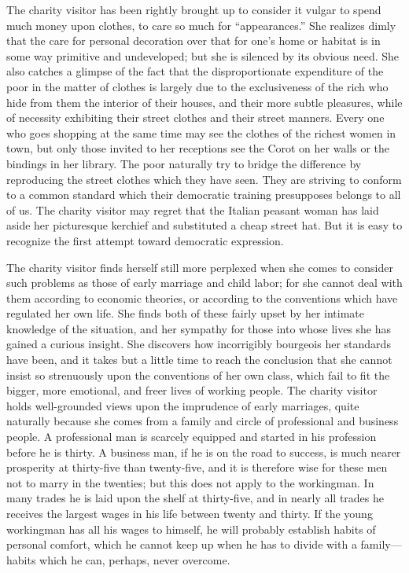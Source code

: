 \documentclass[]{article}
\begin{document}
\begin{sectionbody}
\addamsparagraph The charity visitor has been rightly brought up to consider it vulgar to
spend much money upon clothes, to care so much for ``appearances.'' She
realizes dimly that the care for personal decoration over that for one's
home or habitat is in some way primitive and undeveloped; but she is
silenced by its obvious need. She also catches a glimpse of the fact
that the disproportionate expenditure of the poor in the matter of
clothes is largely due to the exclusiveness of the rich who hide from
them the interior of their houses, and their more subtle pleasures,
while of necessity exhibiting their street clothes and their street
manners. Every one who goes shopping at the same time may see the
clothes of the richest women in town, but only those invited to her
receptions see the Corot on her walls or the bindings in her library.
The poor naturally try to bridge the difference by reproducing the
street clothes which they have seen. They are striving to conform to a
common standard which their democratic training presupposes belongs to
all of us. The charity visitor may regret that the Italian peasant
woman has laid aside her picturesque kerchief and substituted a cheap
street hat. But it is easy to recognize the first attempt toward
democratic expression.

\addamsparagraph The charity visitor finds herself still more perplexed when she comes to
consider such problems as those of early marriage and child labor; for
she cannot deal with them according to economic theories, or according
to the conventions which have regulated her own life. She finds both of
these fairly upset by her intimate knowledge of the situation, and her
sympathy for those into whose lives she has gained a curious insight.
She discovers how incorrigibly bourgeois her standards have been, and it
takes but a little time to reach the conclusion that she cannot insist
so strenuously upon the conventions of her own class, which fail to fit
the bigger, more emotional, and freer lives of working people. The
charity visitor holds well-grounded views upon the imprudence of early
marriages, quite naturally because she comes from a family and circle
of professional and business people. A professional man is scarcely
equipped and started in his profession before he is thirty. A business
man, if he is on the road to success, is much nearer prosperity at
thirty-five than twenty-five, and it is therefore wise for these men not
to marry in the twenties; but this does not apply to the workingman. In
many trades he is laid upon the shelf at thirty-five, and in nearly all
trades he receives the largest wages in his life between twenty and
thirty. If the young workingman has all his wages to himself, he will
probably establish habits of personal comfort, which he cannot keep up
when he has to divide with a family---habits which he can, perhaps, never
overcome.


\end{sectionbody}
\end{document}
